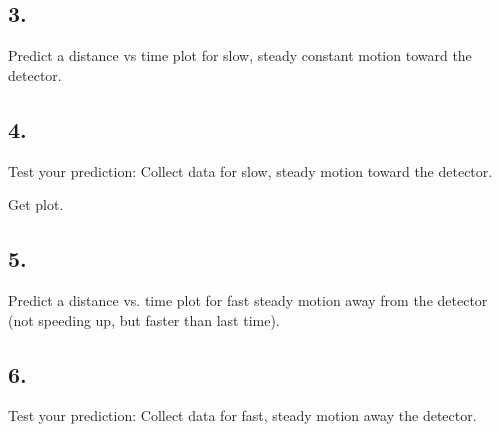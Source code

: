     \subsection*{3.}
    Predict a distance vs time plot for slow, steady constant motion toward the detector.

    \begin{mdframed}
        \centering{}
    \end{mdframed}

    \subsection*{4.}
    Test your prediction: Collect data for slow, steady motion toward the detector. 

    \begin{mdframed}
        Get plot.
    \end{mdframed}

    \pagebreak

    \subsection*{5.}
    Predict a distance vs. time plot for fast steady motion away from the detector (not speeding up, but faster than last time).

    \begin{mdframed}
        \centering{}
    \end{mdframed}

    \subsection*{6.}
    Test your prediction: Collect data for fast, steady motion away the detector. 

